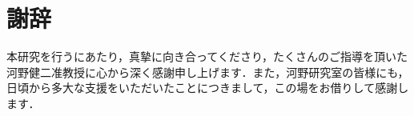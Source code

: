 \section*{謝辞}
本研究を行うにあたり，真摯に向き合ってくださり，たくさんのご指導を頂いた河野健二准教授に心から深く感謝申し上げます．また，河野研究室の皆様にも，日頃から多大な支援をいただいたことにつきまして，この場をお借りして感謝します．
